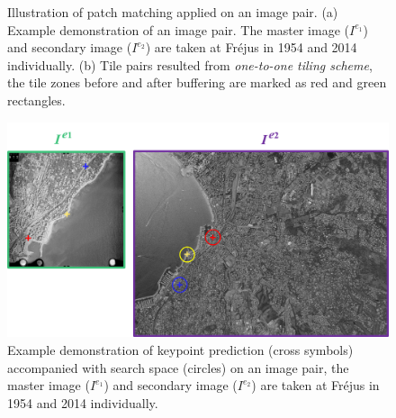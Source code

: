\begin{figure}[htbp]
\begin{center}
{\begin{minipage}[t]{1\linewidth}
			\end{minipage}%
		}
		\caption{Illustration of patch matching applied on an image pair. (a) Example demonstration of an image pair. The master image ($I^{e_1}$) and secondary image ($I^{e_2}$) are taken at Fr{\'e}jus in 1954 and 2014 individually. (b) Tile pairs resulted from \textit{one-to-one tiling scheme}, the tile zones before and after buffering are marked as red and green rectangles.}
		\label{patchexample}
	\end{center}
\end{figure}

\begin{figure}[htbp]
	\begin{center}
				\centering
				\includegraphics[width=1\columnwidth]{images/Chapitre4/guidedexample.png}
		\caption{Example demonstration of keypoint prediction (cross symbols) accompanied with search space (circles) on an image pair, the master image ($I^{e_1}$) and secondary image ($I^{e_2}$) are taken at Fr{\'e}jus in 1954 and 2014 individually.}
		\label{guidedexample}
	\end{center}
\end{figure}

